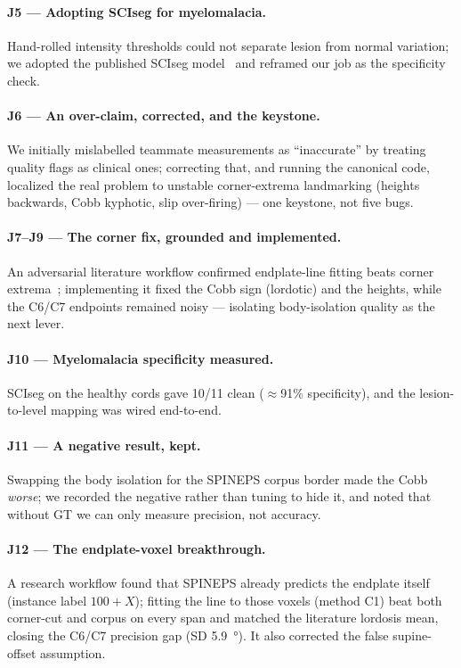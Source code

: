 \paragraph{J5 --- Adopting SCIseg for myelomalacia.} Hand-rolled intensity thresholds could not separate
lesion from normal variation; we adopted the published SCIseg model~\cite{sciseg2024} and reframed our
job as the specificity check.

\paragraph{J6 --- An over-claim, corrected, and the keystone.} We initially mislabelled teammate
measurements as ``inaccurate'' by treating quality flags as clinical ones; correcting that, and running
the canonical code, localized the real problem to unstable corner-extrema landmarking (heights backwards,
Cobb kyphotic, slip over-firing) --- one keystone, not five bugs.

\paragraph{J7--J9 --- The corner fix, grounded and implemented.} An adversarial literature workflow
confirmed endplate-line fitting beats corner extrema~\cite{wang2023,chen2013}; implementing it fixed the
Cobb sign (lordotic) and the heights, while the C6/C7 endpoints remained noisy --- isolating
body-isolation quality as the next lever.

\paragraph{J10 --- Myelomalacia specificity measured.} SCIseg on the healthy cords gave 10/11 clean
($\approx$91\% specificity), and the lesion-to-level mapping was wired end-to-end.

\paragraph{J11 --- A negative result, kept.} Swapping the body isolation for the SPINEPS corpus border
made the Cobb \emph{worse}; we recorded the negative rather than tuning to hide it, and noted that without
GT we can only measure precision, not accuracy.

\paragraph{J12 --- The endplate-voxel breakthrough.} A research workflow found that SPINEPS already
predicts the endplate itself (instance label $100+X$); fitting the line to those voxels (method C1) beat
both corner-cut and corpus on every span and matched the literature lordosis mean, closing the C6/C7
precision gap (SD \SI{5.9}{\degree}). It also corrected the false supine-offset assumption.

